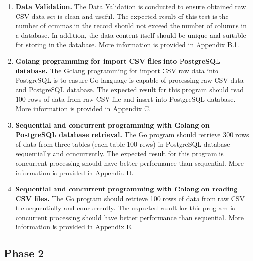 \begin{enumerate}[topsep=0pt,itemsep=-1ex,partopsep=1ex,parsep=1.5ex]
	
	\item \textbf{Data Validation.}
	 The Data Validation is conducted to ensure obtained raw CSV data set is clean and useful. The expected result of this test is the number of commas in the record should not exceed the number of columns in a database. In addition, the data content itself should be unique and suitable for storing in the database. More information is provided in Appendix B.1.
		
	\item \textbf{Golang programming for import CSV files into PostgreSQL database.}
	The Golang programming for import CSV raw data into PostgreSQL is to ensure Go language is capable of processing raw CSV data and PostgreSQL database. The expected result for this program should read 100 rows of data from raw CSV file and insert into PostgreSQL database. More information is provided in Appendix C.
	
	\item \textbf{Sequential and concurrent programming with Golang on PostgreSQL database retrieval.}
    The Go program should retrieve 300 rows of data from three tables (each table 100 rows) in PostgreSQL database sequentially and concurrently. The expected result for this program is concurrent processing should have better performance than sequential. More information is provided in Appendix D.	
	
	\item \textbf{Sequential and concurrent programming with Golang on reading CSV files.}
	The Go program should retrieve 100 rows of data from raw CSV file sequentially and concurrently. The expected result for this program is concurrent processing should have better performance than sequential. More information is provided in Appendix E.
	 
\end{enumerate}

\subsection{Phase 2}

